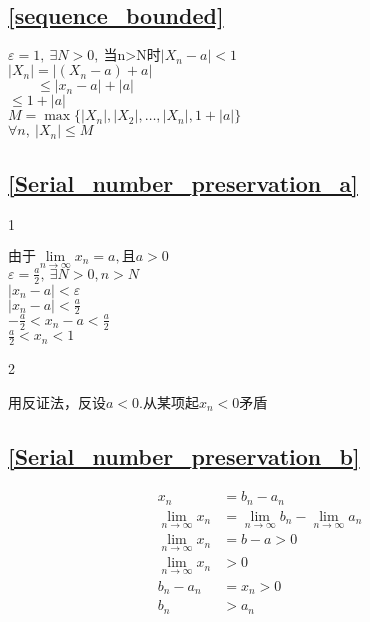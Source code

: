 \subsection{\ref{sequence_bounded}}
    \begin{center}
       $\varepsilon =1,\ \exists N>0,\ \mbox{当n>N时}\left|X_n-a\right|<1$\\
        $\left|X_n\right|=\left|(X_n-a)+a\right|$\\
        $\qquad\leqslant \left|x_n-a\right|+\left|a\right|$\\
        $\leqslant 1+\left|a\right|$\\
        $M=\max\{\left|X_n\right|,\left|X_2\right|,\dots,\left|X_n\right|,1+\left|a\right|\}$\\
        $\forall n,\ \left|X_n\right|\leqslant M$
    \end{center}
\subsection{\ref{Serial_number_preservation_a}}
    \begin{center}1\end{center}
    $\mbox{由于}\lim\limits_{n\to\infty}x_n = a,\mbox{且}a>0$\\
    $\varepsilon = \frac{a}{2},\ \exists N>0,n>N$\\
    $\left|x_n-a\right|<\varepsilon$\\
    $\left|x_n-a\right|<\frac{a}{2}$\\
    $-\frac{a}{2}<x_n-a<\frac{a}{2}$\\
    $\frac{a}{2}<x_n<1$
    \begin{center}2\end{center}
    用反证法，反设$a<0$.从某项起$x_n<0$矛盾
\subsection{\ref{Serial_number_preservation_b}}
\begin{displaymath}
    \begin{split}
        x_n&=b_n-a_n\\
        \lim\limits_{n\to\infty} x_n &= \lim\limits_{n\to\infty} b_n-\lim\limits_{n\to\infty}a_n\\
        \lim\limits_{n\to\infty} x_n &=b-a>0\\
        \lim\limits_{n\to\infty} x_n &>0 \\
        b_n-a_n&=x_n > 0\\
        b_n&>a_n
    \end{split}
\end{displaymath}


